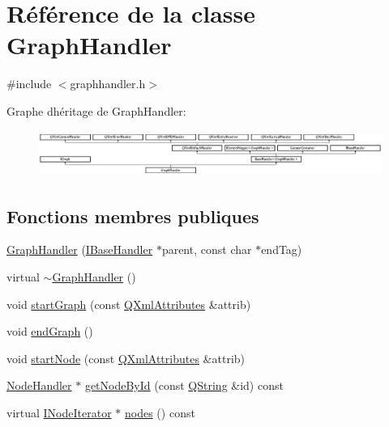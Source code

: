\hypertarget{class_graph_handler}{}\section{Référence de la classe Graph\+Handler}
\label{class_graph_handler}


{\ttfamily \#include $<$graphhandler.\+h$>$}

Graphe d\textquotesingle{}héritage de Graph\+Handler\+:\begin{figure}[H]
\begin{center}
\leavevmode
\includegraphics[height=1.509434cm]{class_graph_handler}
\end{center}
\end{figure}
\subsection*{Fonctions membres publiques}
\begin{DoxyCompactItemize}
\item 
\hyperlink{class_graph_handler_a51f06fa9225e0f5d074972db4b063d2d}{Graph\+Handler} (\hyperlink{class_i_base_handler}{I\+Base\+Handler} $\ast$parent, const char $\ast$end\+Tag)
\item 
virtual \hyperlink{class_graph_handler_a6b0d53248b0e2c2bac728a6db448236c}{$\sim$\+Graph\+Handler} ()
\item 
void \hyperlink{class_graph_handler_a5da61c7fea27c41f6bf6bd793a72ae1c}{start\+Graph} (const \hyperlink{class_q_xml_attributes}{Q\+Xml\+Attributes} \&attrib)
\item 
void \hyperlink{class_graph_handler_a6485764ae40328b3f94b49ab43293287}{end\+Graph} ()
\item 
void \hyperlink{class_graph_handler_a681595998c8b91270b3522456cfca6c8}{start\+Node} (const \hyperlink{class_q_xml_attributes}{Q\+Xml\+Attributes} \&attrib)
\item 
\hyperlink{class_node_handler}{Node\+Handler} $\ast$ \hyperlink{class_graph_handler_a8558cadcad38d2f56b1edafb2d4bc4ae}{get\+Node\+By\+Id} (const \hyperlink{class_q_string}{Q\+String} \&id) const 
\item 
virtual \hyperlink{class_i_node_iterator}{I\+Node\+Iterator} $\ast$ \hyperlink{class_graph_handler_abe41abd519d96a3ee62e6fd9dc4ee5a8}{nodes} () const 
\end{DoxyCompactItemize}
